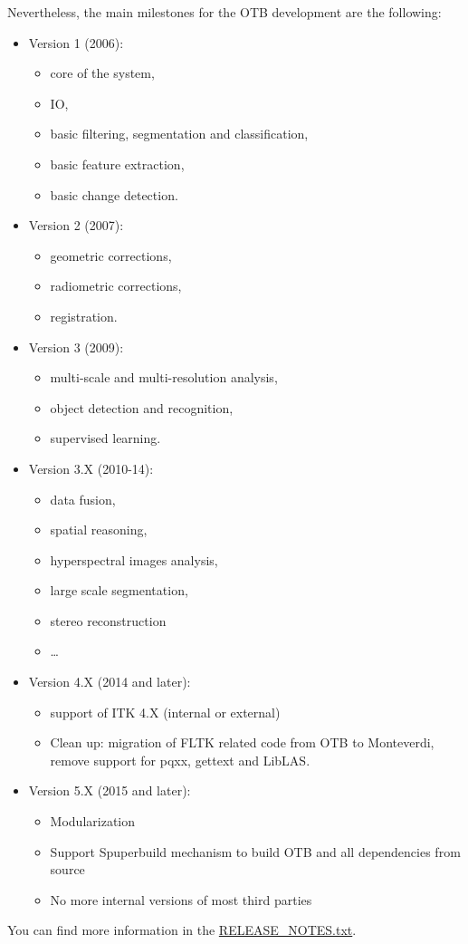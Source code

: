 Nevertheless, the main milestones for the OTB development are the
following:
\begin{itemize}
  \item{Version 1 (2006):}
  \begin{itemize}
    \item core of the system,
    \item IO,
    \item basic filtering, segmentation and classification,
    \item basic feature extraction,
    \item basic change detection.
  \end{itemize}
  \item{Version 2 (2007):}
  \begin{itemize}
    \item geometric corrections,
    \item radiometric corrections,
    \item registration.
  \end{itemize}
  \item{Version 3 (2009):}
  \begin{itemize}
    \item multi-scale and multi-resolution analysis,
    \item object detection and recognition,
    \item supervised learning.
  \end{itemize}
  \item{Version 3.X (2010-14):}
  \begin{itemize}
	  \item data fusion,
	  \item spatial reasoning,
    \item hyperspectral images analysis,
    \item large scale segmentation,
    \item stereo reconstruction
    \item \ldots
  \end{itemize}
  \item{Version 4.X (2014 and later):}
  \begin{itemize}
    \item support of ITK 4.X (internal or external)
    \item Clean up: migration of FLTK related code from OTB to
          Monteverdi, remove support for pqxx, gettext and LibLAS.
  \end{itemize}
  \item{Version 5.X (2015 and later):}
  \begin{itemize}
    \item Modularization
    \item Support Spuperbuild mechanism to build OTB and all dependencies
          from source
    \item No more internal versions of most third parties
  \end{itemize}

\end{itemize}

You can find more information in the \href{https://git.orfeo-toolbox.org/otb.git/blob/HEAD:/RELEASE_NOTES.txt}{RELEASE\_NOTES.txt}.
